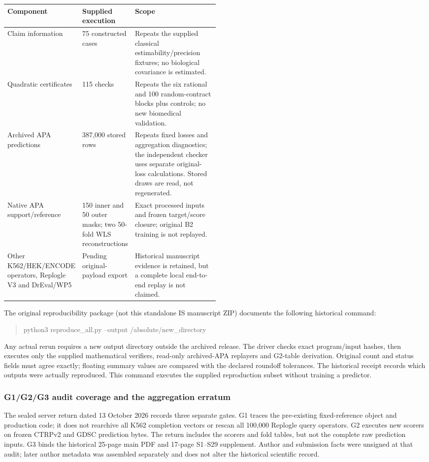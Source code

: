 \documentclass[11pt]{article}
\begin{document}
\begin{center}
\small
\begin{tabularx}{\linewidth}{@{}L{0.28\linewidth}L{0.22\linewidth}X@{}}
\toprule
Component & Supplied execution & Scope \\
\midrule
Claim information & 75 constructed cases & Repeats the supplied classical estimability/precision fixtures; no biological covariance is estimated. \\
Quadratic certificates & 115 checks & Repeats the six rational and 100 random-contract blocks plus controls; no new biomedical validation. \\
Archived APA predictions & 387,000 stored rows & Repeats fixed losses and aggregation diagnostics; the independent checker uses separate original-loss calculations. Stored draws are read, not regenerated. \\
Native APA support/reference & 150 inner and 50 outer masks; two 50-fold WLS reconstructions & Exact processed inputs and frozen target/score closure; original B2 training is not replayed. \\
Other K562/HEK/ENCODE operators, Replogle V3 and DrEval/WP5 & Pending original-payload export & Historical manuscript evidence is retained, but a complete local end-to-end replay is not claimed. \\
\bottomrule
\end{tabularx}
\end{center}

The original reproducibility package (not this standalone IS manuscript ZIP) documents the following historical command:
\begin{quote}\small\ttfamily
python3 reproduce\_all.py --output /absolute/new\_directory
\end{quote} Any actual rerun requires a new output directory outside the archived release. The driver checks exact program/input hashes, then executes only the supplied mathematical verifiers, read-only archived-APA replayers and G2-table derivation. Original count and status fields must agree exactly; floating summary values are compared with the declared roundoff tolerances. The historical receipt records which outputs were actually reproduced. This command executes the supplied reproduction subset without training a predictor.


\subsubsection{G1/G2/G3 audit coverage and the aggregation erratum}
The sealed server return dated 13 October 2026 records three separate gates. G1 traces the pre-existing fixed-reference object and production code; it does not rearchive all K562 completion vectors or rescan all 100,000 Replogle query operators. G2 executes new scorers on frozen CTRPv2 and GDSC prediction bytes. The return includes the scorers and fold tables, but not the complete raw prediction inputs. G3 binds the historical 25-page main PDF and 17-page S1--S29 supplement. Author and submission facts were unsigned at that audit; later author metadata was assembled separately and does not alter the historical scientific record.
\end{document}

